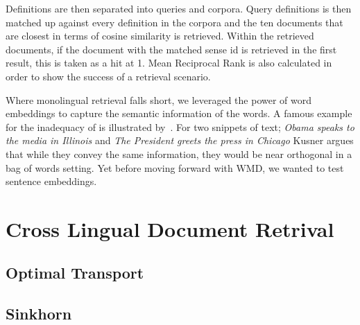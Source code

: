 Definitions are then separated into queries and corpora.
Query definitions is then matched up against every definition in the corpora and the ten documents that are closest in terms of cosine similarity is retrieved.
Within the retrieved documents, if the document with the matched sense id is retrieved in the first result, this is taken as a hit at 1.
Mean Reciprocal Rank is also calculated in order to show the success of a retrieval scenario.

Where monolingual retrieval falls short, we leveraged the power of word embeddings to capture the semantic information of the words.
A famous example for the inadequacy of \tfidf{} is illustrated by~\cite{kusner_word_2015}.
For two snippets of text; \emph{Obama speaks to the media in Illinois} and \emph{The President greets the press in Chicago} Kusner argues that while they convey the same information, they would be near orthogonal in a bag of words setting.
Yet before moving forward with WMD, we wanted to test sentence embeddings.

\section{Cross Lingual Document Retrival}%
\label{sec:cross_lingual_document_retrival}

\subsection{Optimal Transport}%
\label{sub:optimal_transport}

\subsection{Sinkhorn}%
\label{sub:sinkhorn}






